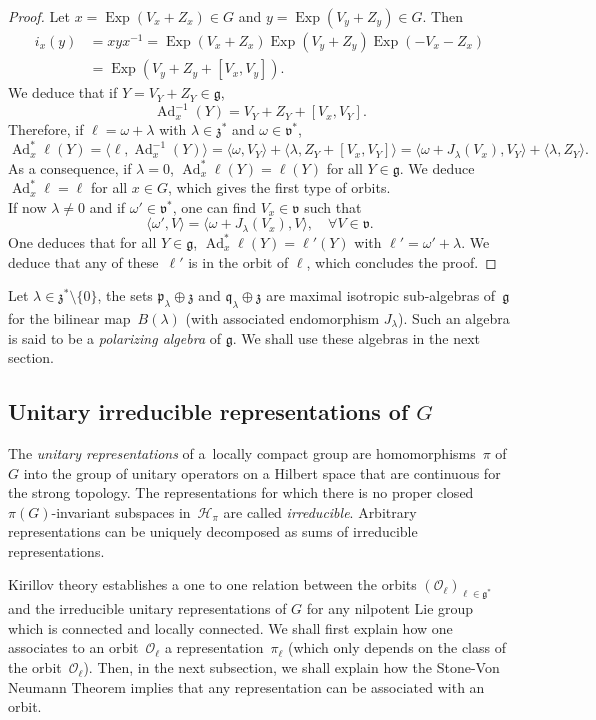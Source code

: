 \documentclass[JEP,XML,SOM,Unicode,published]{cedram}
\let\mathcal\mathscr
\DeclareMathOperator{\Ad}{Ad}
\DeclareMathOperator{\Exp}{Exp}
\theoremstyle{plain}
\theoremstyle{definition}
\begin{document}
\begin{proof}
Let $x=\Exp (V_x+ Z_x)\in G$ and $y=\Exp (V_y+ Z_y)\in G$. Then
\begin{align*}
i_x (y)& = x y x^{-1} = \Exp (V_x+Z_x)\Exp (V_y+Z_y) \Exp (- V_x - Z_x)\\
&= \Exp (V _y+ Z_y+[V_x,V_y]).
\end{align*}
We deduce that if $Y= V_Y+Z_Y\in\mathfrak g$,
\[
\Ad_x^{-1} (Y)= V_Y + Z_Y+[V_x,V_Y].
\]
Therefore, if $\ell= \omega+ \lambda$ with $\lambda \in \mathfrak z^*$ and $\omega \in \mathfrak v^*$,
\[
\Ad_x^*\ell (Y)= \langle \ell, \Ad_x^{-1} (Y)\rangle =\langle \omega, V_Y\rangle +\langle \lambda, Z_Y+[V_x,V_Y]\rangle =\langle \omega +J_\lambda(V_x),V_Y\rangle +\langle \lambda, Z_Y\rangle.
\]
As a consequence, if $\lambda=0$, $\Ad_x^*\ell (Y)=\ell(Y)$ for all $Y\in\mathfrak g$. We deduce $\Ad_x^*\ell=\ell $ for all $x\in G$, which gives the first type of orbits. \\
If now $\lambda\not=0$ and if $\omega'\in \mathfrak v^* $, one can find $V_x\in \mathfrak v$ such that
\[
\langle \omega', V\rangle =\langle \omega+J_\lambda(V_x),V\rangle,\quad \forall V\in \mathfrak v.
\]
One deduces that for all $Y\in \mathfrak g$, $\Ad_x^*\ell (Y)= \ell'(Y)$ with $\ell'= \omega'+\lambda$.
We deduce that any of these~$\ell'$ is in the orbit of $\ell$, which concludes the proof.
\end{proof}

Let $\lambda\in \mathfrak z^*\setminus\{0\}$, the sets $\mathfrak p_\lambda\oplus \mathfrak z $ and $\mathfrak q_\lambda \oplus \mathfrak z $ are maximal isotropic sub-algebras of~$\mathfrak g$ for the bilinear map~$B(\lambda)$ (with associated endomorphism $J_\lambda$). Such an algebra is said to be a \emph{polarizing algebra} of $\mathfrak g$. We shall use these algebras in the next section.

\subsection{Unitary irreducible representations of $G$} The \emph{unitary representations} of a~locally compact group are homomorphisms~$\pi$ of $G$ into the group of unitary operators on a Hilbert space that are continuous for the strong topology. The representations for which there is no proper closed $\pi(G)$-invariant subspaces in~${\mathcal H}_\pi$ are called \emph{irreducible}. Arbitrary representations can be uniquely decomposed as sums of irreducible representations.

Kirillov theory establishes a one to one relation between the orbits $(\mathcal O_\ell) _{\ell \in \mathfrak g^*}$ and the irreducible unitary representations of $G$ for any nilpotent Lie group which is connected and locally connected. We shall first explain how one associates to an orbit~$\mathcal O_\ell$ a representation~$\pi_\ell$ (which only depends on the class of the orbit~$\mathcal O_\ell$). Then, in the next subsection, we shall explain how the Stone-Von Neumann Theorem implies that any representation can be associated with an orbit.
\end{document}

